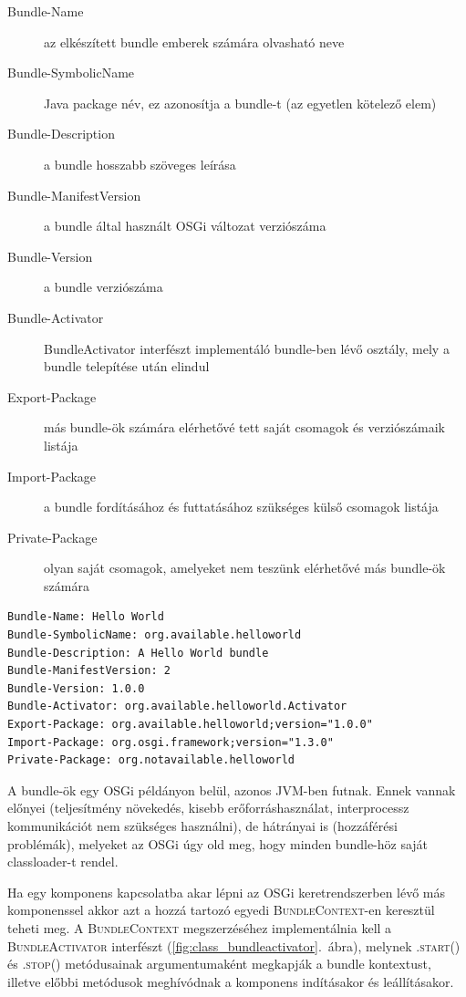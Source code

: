 \begin{description}
	\item[Bundle-Name] az elkészített bundle emberek számára olvasható neve
	\item[Bundle-SymbolicName] Java package név, ez azonosítja a bundle-t (az egyetlen kötelező elem)
	\item[Bundle-Description] a bundle hosszabb szöveges leírása
	\item[Bundle-ManifestVersion] a bundle által használt OSGi változat verziószáma
	\item[Bundle-Version] a bundle verziószáma
	\item[Bundle-Activator] BundleActivator interfészt implementáló bundle-ben lévő osztály, mely a bundle telepítése után elindul
	\item[Export-Package] más bundle-ök számára elérhetővé tett saját csomagok és verziószámaik listája
	\item[Import-Package] a bundle fordításához és futtatásához szükséges külső csomagok listája
	\item[Private-Package] olyan saját csomagok, amelyeket nem teszünk elérhetővé más bundle-ök számára
\end{description}

\begin{lstlisting}[label={lst:manifest}, caption=MANIFEST.MF,breaklines=true]
Bundle-Name: Hello World
Bundle-SymbolicName: org.available.helloworld
Bundle-Description: A Hello World bundle
Bundle-ManifestVersion: 2
Bundle-Version: 1.0.0
Bundle-Activator: org.available.helloworld.Activator
Export-Package: org.available.helloworld;version="1.0.0"
Import-Package: org.osgi.framework;version="1.3.0"
Private-Package: org.notavailable.helloworld
\end{lstlisting}


A bundle-ök egy OSGi példányon belül, azonos JVM-ben futnak. Ennek vannak előnyei (teljesítmény növekedés, kisebb erőforráshasználat, interprocessz kommunikációt nem szükséges használni), de hátrányai is (hozzáférési problémák), melyeket az OSGi úgy old meg, hogy minden bundle-höz saját classloader-t rendel.

Ha egy komponens kapcsolatba akar lépni az OSGi keretrendszerben lévő más komponenssel akkor azt a hozzá tartozó egyedi \textsc{BundleContext}-en keresztül teheti meg. A \textsc{BundleContext} megszerzéséhez implementálnia kell a \textsc{BundleActivator} interfészt (\ref{fig:class_bundleactivator}.~ábra), melynek \textsc{.start()} és \textsc{.stop()} metódusainak argumentumaként megkapják a bundle kontextust, illetve előbbi metódusok meghívódnak a komponens indításakor és leállításakor.

